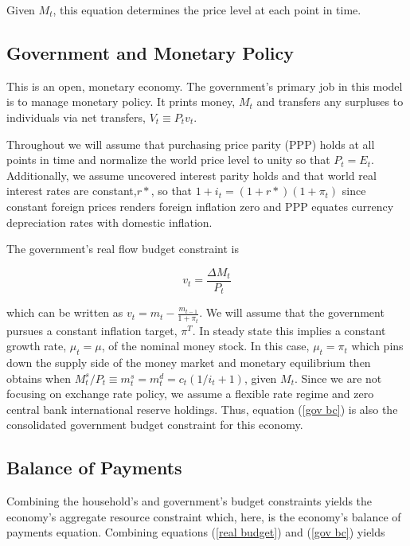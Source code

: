 \documentclass{OUP-EJ}
\begin{document}
Given $M_t$, this equation determines the price level at each point in time.

\subsection{Government and Monetary Policy}

This is an open, monetary economy.  The government's primary job in this model is to manage monetary policy. It prints money, $M_t$ and transfers any surpluses to individuals via net transfers, $V_t \equiv P_t v_t$. 

Throughout we will assume that purchasing price parity (PPP) holds at all points in time and normalize the world price level to unity so that $P_t = E_t$.  Additionally, we assume uncovered interest parity holds and that world real interest rates are constant,$r*$, so that $1+i_t=(1+r*)(1+\pi_t)$ since constant foreign prices renders foreign inflation zero and PPP equates currency depreciation rates with domestic inflation.

The government's real flow budget constraint is

\begin{equation}
    \label{gov bc}
    v_t=\frac{\Delta M_t}{P_t}
\end{equation}

which can be written as $v_t=m_t - \frac{m_{t-1}}{1+\pi_t}$. We will assume that the government pursues a constant inflation target, $\pi^T$.  In steady state this implies a constant growth rate, $\mu_t=\mu$, of the nominal money stock.  In this case, $\mu_t = \pi_t$ which pins down the supply side of the money market and monetary equilibrium then obtains when $M_t^s / P_t \equiv m^s_t=m^d_t=c_t(1/i_t +1)$, given $M_t$.  Since we are not focusing on exchange rate policy, we assume a flexible rate regime and zero central bank international reserve holdings. Thus, equation (\ref{gov bc}) is also the consolidated government budget constraint for this economy.

\subsection{Balance of Payments}

Combining the household's and government's budget constraints yields the economy's aggregate resource constraint which, here, is the economy's balance of payments equation.  Combining equations (\ref{real budget}) and (\ref{gov bc}) yields
\end{document}
